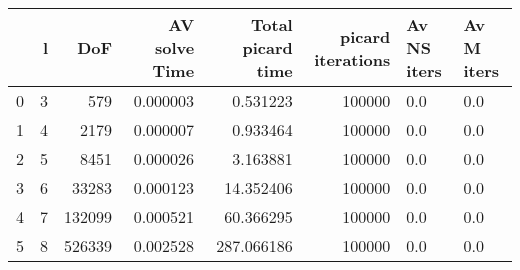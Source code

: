\begin{tabular}{lrrrrrll}
\toprule
{} &  l &     DoF &  AV solve Time &  Total picard time &  picard iterations & Av NS iters & Av M iters \\
\midrule
0 &  3 &     579 &       0.000003 &           0.531223 &             100000 &         0.0 &        0.0 \\
1 &  4 &    2179 &       0.000007 &           0.933464 &             100000 &         0.0 &        0.0 \\
2 &  5 &    8451 &       0.000026 &           3.163881 &             100000 &         0.0 &        0.0 \\
3 &  6 &   33283 &       0.000123 &          14.352406 &             100000 &         0.0 &        0.0 \\
4 &  7 &  132099 &       0.000521 &          60.366295 &             100000 &         0.0 &        0.0 \\
5 &  8 &  526339 &       0.002528 &         287.066186 &             100000 &         0.0 &        0.0 \\
\bottomrule
\end{tabular}
